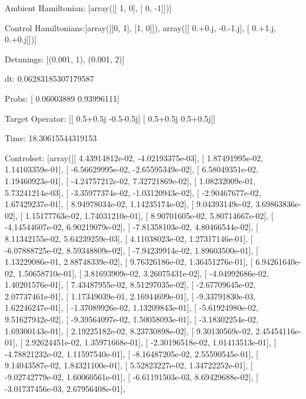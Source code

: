 \documentclass{article}
\begin{document}
    

\newpage

Ambient Hamiltonian: [array([[ 1,  0],
       [ 0, -1]])]

Control Hamiltonians:[array([[0, 1],
       [1, 0]]), array([[ 0.+0.j, -0.-1.j],
       [ 0.+1.j,  0.+0.j]])]

Detunings: [(0.001, 1), (0.001, 2)]

 dt: 0.06283185307179587

Probs: [ 0.06003889  0.93996111]

Target Operator: [[ 0.5+0.5j -0.5-0.5j]
 [ 0.5+0.5j  0.5+0.5j]]

Time: 18.30615544319153

Controlset: [array([[  4.43914812e-02,  -4.02193375e-03],
       [  1.87491995e-02,   1.14103359e-01],
       [ -6.56629995e-02,  -2.65595349e-02],
       [  6.58049351e-02,   1.19460923e-01],
       [ -4.24757212e-02,   7.32721869e-02],
       [  1.08232009e-01,   5.73241214e-03],
       [ -3.35977374e-02,  -1.03120943e-02],
       [ -2.90467677e-02,   1.67429237e-01],
       [  8.94978034e-02,   1.14235174e-02],
       [  9.04393149e-02,   3.69863836e-02],
       [  1.15177763e-02,   1.74031210e-01],
       [  8.90701605e-02,   5.80714667e-02],
       [ -4.14544607e-02,   6.90219079e-02],
       [ -7.81358103e-02,   4.80466544e-02],
       [  8.11342155e-02,   5.64239259e-03],
       [  4.11038023e-02,   1.27317146e-01],
       [ -6.07888725e-02,   8.59348809e-02],
       [ -7.94239914e-02,   1.89603500e-01],
       [  1.13229086e-01,   2.88748339e-02],
       [  9.76326186e-02,   1.36451276e-01],
       [  6.94261640e-02,   1.50658710e-01],
       [  3.81693909e-02,   3.26075431e-02],
       [ -4.04992686e-02,   1.40201576e-01],
       [  7.43487955e-02,   8.51297035e-02],
       [ -2.67709645e-02,   2.07737461e-01],
       [  1.17349039e-01,   2.16944699e-01],
       [ -9.33791830e-03,   1.62246247e-01],
       [ -1.37089926e-02,   1.13209843e-01],
       [ -5.61924980e-02,   9.51627942e-02],
       [ -9.39564097e-02,   1.50058093e-01],
       [ -3.18302254e-02,   1.69300143e-01],
       [  2.19225182e-02,   8.23730898e-02],
       [  9.30130569e-02,   2.45454116e-01],
       [  2.92624451e-02,   1.35971668e-01],
       [ -2.30196518e-02,   1.01413513e-01],
       [ -4.78821232e-02,   1.11597540e-01],
       [ -8.16487205e-02,   2.55590545e-01],
       [  9.14043587e-02,   1.84321100e-01],
       [  5.52823227e-02,   1.34722252e-01],
       [ -9.02742779e-02,   1.60060561e-01],
       [ -6.61191503e-03,   8.69429688e-02],
       [ -3.01737456e-03,   2.67956408e-01],
\end{document}
